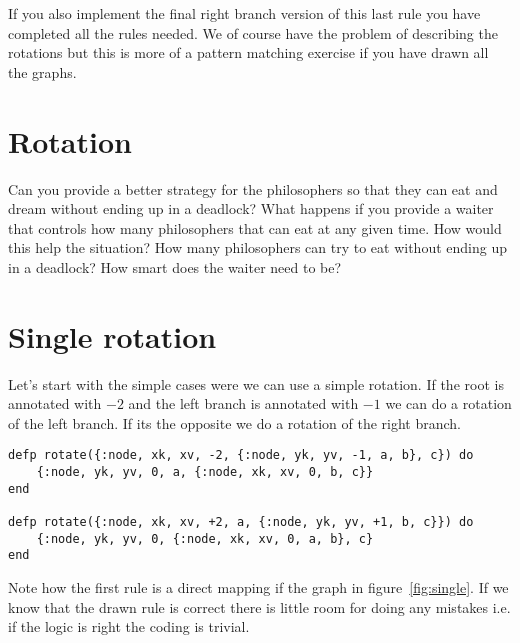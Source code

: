 \documentclass[a4paper,11pt]{article}
\begin{document}
If you also implement the final right branch version of this last rule
you have completed all the rules needed. We of course have the problem
of describing the rotations but this is more of a pattern matching
exercise if you have drawn all the graphs.



\section{Rotation}

Can you provide a better strategy for the philosophers so that they
can eat and dream without ending up in a deadlock? What happens if
you provide a waiter that controls how many philosophers that can eat
at any given time. How would this help the situation? How many
philosophers can try to eat without ending up in a deadlock? How
smart does the waiter need to be?



\section{Single rotation}

Let's start with the simple cases were we can use a simple
rotation. If the root is annotated with $-2$ and the left branch is
annotated with $-1$ we can do a rotation of the left branch. If its the
opposite we do a rotation of the right branch.

\begin{verbatim}
defp rotate({:node, xk, xv, -2, {:node, yk, yv, -1, a, b}, c}) do
    {:node, yk, yv, 0, a, {:node, xk, xv, 0, b, c}}	    
end

defp rotate({:node, xk, xv, +2, a, {:node, yk, yv, +1, b, c}}) do
    {:node, yk, yv, 0, {:node, xk, xv, 0, a, b}, c}
end
\end{verbatim}

Note how the first rule is a direct mapping if the graph in
figure~\ref{fig:single}. If we know that the drawn rule is correct
there is little room for doing any mistakes i.e. if the logic is right
the coding is trivial.


\end{document}
